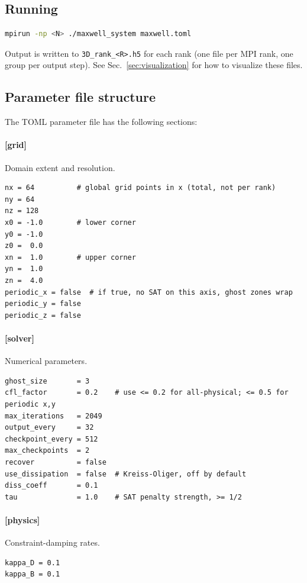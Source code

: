 \documentclass[11pt]{article}
\begin{document}
\subsection{Running}

\begin{lstlisting}[language=bash]
mpirun -np <N> ./maxwell_system maxwell.toml
\end{lstlisting}
Output is written to \texttt{3D\_rank\_<R>.h5} for each rank
(one file per MPI rank, one group per output step). See
Sec.~\ref{sec:visualization} for how to visualize these files.

\subsection{Parameter file structure}

The TOML parameter file has the following sections:

\paragraph{[grid]} Domain extent and resolution.
\begin{lstlisting}[language={}]
nx = 64          # global grid points in x (total, not per rank)
ny = 64
nz = 128
x0 = -1.0        # lower corner
y0 = -1.0
z0 =  0.0
xn =  1.0        # upper corner
yn =  1.0
zn =  4.0
periodic_x = false  # if true, no SAT on this axis, ghost zones wrap
periodic_y = false
periodic_z = false
\end{lstlisting}

\paragraph{[solver]} Numerical parameters.
\begin{lstlisting}[language={}]
ghost_size       = 3
cfl_factor       = 0.2    # use <= 0.2 for all-physical; <= 0.5 for periodic x,y
max_iterations   = 2049
output_every     = 32
checkpoint_every = 512
max_checkpoints  = 2
recover          = false
use_dissipation  = false  # Kreiss-Oliger, off by default
diss_coeff       = 0.1
tau              = 1.0    # SAT penalty strength, >= 1/2
\end{lstlisting}

\paragraph{[physics]} Constraint-damping rates.
\begin{lstlisting}[language={}]
kappa_D = 0.1
kappa_B = 0.1
\end{lstlisting}
\end{document}
